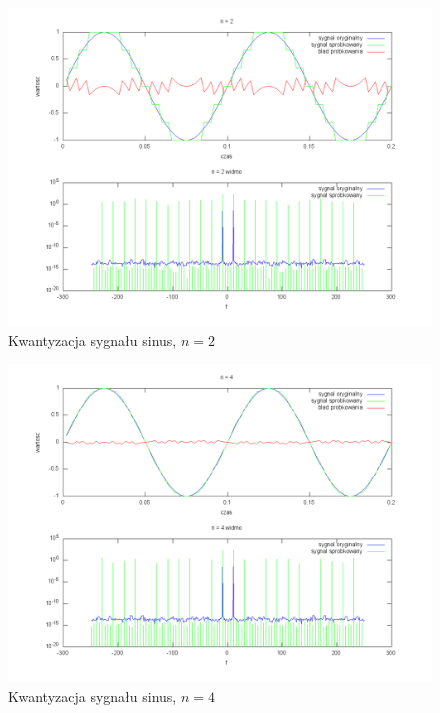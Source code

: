 \documentclass[wide,a4paper,titlepage,12pt]{mwart}
\begin{document}
	\begin{landscape}
	  \begin{figure}[htbp]
	    \begin{center}
	      \includegraphics[scale=.5]{out/kwant1-2.png}
	      \caption{\label{kwant1-2} Kwantyzacja sygnału sinus, $n=2$}
	    \end{center}
	  \end{figure}
	\end{landscape}

	\begin{landscape}
	  \begin{figure}[htbp]
	    \begin{center}
	      \includegraphics[scale=.5]{out/kwant1-4.png}
	      \caption{\label{kwant1-4} Kwantyzacja sygnału sinus, $n=4$}
	    \end{center}
	  \end{figure}
	\end{landscape}
\end{document}

